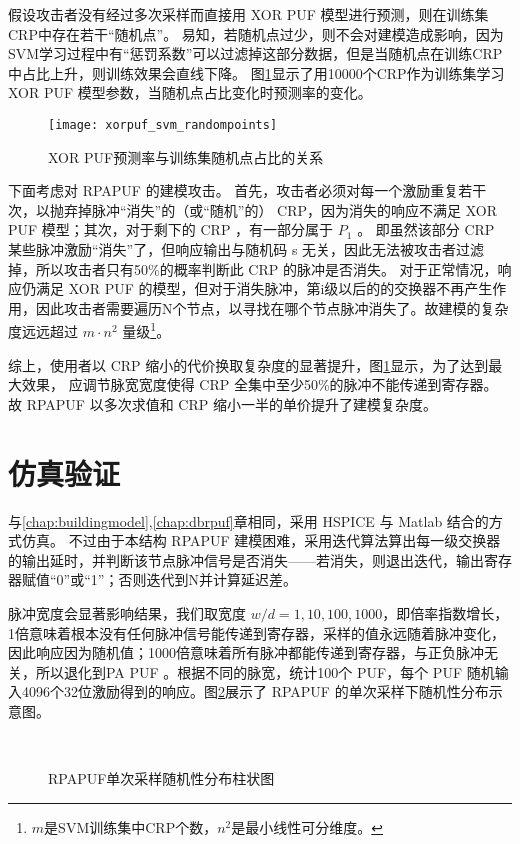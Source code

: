 假设攻击者没有经过多次采样而直接用 XOR PUF 模型进行预测，则在训练集CRP中存在若干``随机点''。
易知，若随机点过少，则不会对建模造成影响，因为SVM学习过程中有``惩罚系数''可以过滤掉这部分数据，但是当随机点在训练CRP中占比上升，则训练效果会直线下降。
图\ref{fig:xor-svm-random}显示了用10000个CRP作为训练集学习 XOR PUF 模型参数，当随机点占比变化时预测率的变化。

\begin{figure}[htb!]
\centering
\texttt{[image: xorpuf\_svm\_randompoints]}
\caption{XOR PUF预测率与训练集随机点占比的关系}
\label{fig:xor-svm-random}
\end{figure}

下面考虑对 RPAPUF 的建模攻击。
首先，攻击者必须对每一个激励重复若干次，以抛弃掉脉冲``消失''的（或``随机''的） CRP，因为消失的响应不满足 XOR PUF 模型；其次，对于剩下的 CRP ，有一部分属于 $ P_1 $ 。 即虽然该部分 CRP 某些脉冲激励``消失''了，但响应输出与随机码 s 无关，因此无法被攻击者过滤掉，所以攻击者只有50\%的概率判断此 CRP 的脉冲是否消失。
对于正常情况，响应仍满足 XOR PUF 的模型，但对于消失脉冲，第i级以后的的交换器不再产生作用，因此攻击者需要遍历N个节点，以寻找在哪个节点脉冲消失了。故建模的复杂度远远超过 $ m\cdot n^2 $ 量级\footnote{$ m $是SVM训练集中CRP个数，$ n^2 $是最小线性可分维度。}。

综上，使用者以 CRP 缩小的代价换取复杂度的显著提升，图\ref{fig:xor-svm-random}显示，为了达到最大效果， 应调节脉宽宽度使得 CRP 全集中至少50\%的脉冲不能传递到寄存器。
故 RPAPUF 以多次求值和 CRP 缩小一半的单价提升了建模复杂度。


\section{仿真验证}\label{sec:rpa_simu}
与\ref{chap:buildingmodel},\ref{chap:dbrpuf}章相同，采用 HSPICE 与 Matlab 结合的方式仿真。
不过由于本结构 RPAPUF 建模困难，采用迭代算法算出每一级交换器的输出延时，并判断该节点脉冲信号是否消失——若消失，则退出迭代，输出寄存器赋值``0''或``1''；否则迭代到N并计算延迟差。

脉冲宽度会显著影响结果，我们取宽度 $ w/d={1,10,100,1000} $，即倍率指数增长，1倍意味着根本没有任何脉冲信号能传递到寄存器，采样的值永远随着脉冲变化，因此响应因为随机值；1000倍意味着所有脉冲都能传递到寄存器，与正负脉冲无关，所以退化到PA PUF 。根据不同的脉宽，统计100个 PUF，每个 PUF 随机输入4096个32位激励得到的响应。图\ref{fig:rpa-single-rand}展示了 RPAPUF 的单次采样下随机性分布示意图。

\begin{figure}[htb!]
\centering
{}
\\
\caption{RPAPUF单次采样随机性分布柱状图}
\label{fig:rpa-single-rand}
\end{figure}

